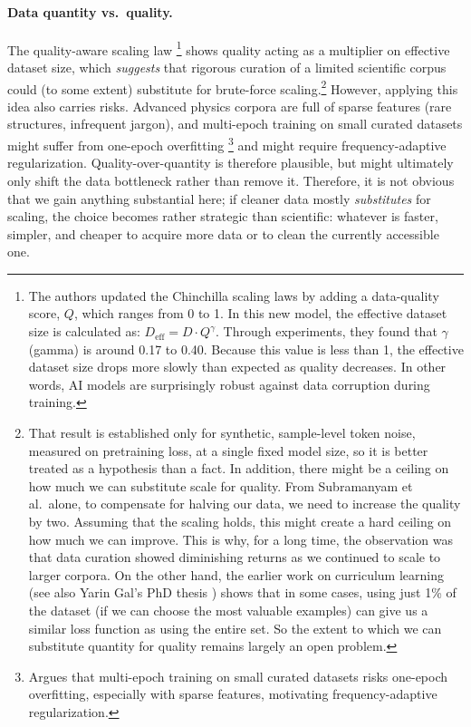 \paragraph{Data quantity vs.\ quality.}
The quality-aware scaling law \cite{2510.03313}\footnote{%
    The authors updated the Chinchilla scaling laws by adding a data-quality score, $Q$, which ranges from 0 to 1. In this new model, the effective dataset size is calculated as: $D_{\mathrm{eff}} = D \cdot Q^\gamma$. Through experiments, they found that $\gamma$ (gamma) is around 0.17 to 0.40. Because this value is less than 1, the effective dataset size drops more slowly than expected as quality decreases. In other words, AI models are surprisingly robust against data corruption during training.
    }
shows quality acting as a multiplier on effective dataset size, which \emph{suggests} that rigorous curation of a limited scientific corpus could (to some extent) substitute for brute-force scaling.\footnote{%
    That result is established only for synthetic, sample-level token noise, measured on pretraining loss, at a single fixed model size, so it is better treated as a hypothesis than a fact. In addition, there might be a ceiling on how much we can substitute scale for quality. From Subramanyam et al.\ alone, to compensate for halving our data, we need to increase the quality by two. Assuming that the scaling holds, this might create a hard ceiling on how much we can improve. This is why, for a long time, the observation was that data curation showed diminishing returns as we continued to scale to larger corpora. On the other hand, the earlier work on curriculum learning (see also Yarin Gal's PhD thesis \cite{gal2016uncertainty}) shows that in some cases, using just 1\% of the dataset (if we can choose the most valuable examples) can give us a similar loss function as using the entire set. So the extent to which we can substitute quantity for quality remains largely an open problem.}
However, applying this idea also carries risks. Advanced physics corpora are full of sparse features (rare structures, infrequent jargon), and multi-epoch training on small curated datasets might suffer from one-epoch overfitting \cite{2511.06374}\footnote{
    Argues that multi-epoch training on small curated datasets risks one-epoch overfitting, especially with sparse features, motivating frequency-adaptive regularization.
    }
and might require frequency-adaptive regularization. Quality-over-quantity is therefore plausible, but might ultimately only shift the data bottleneck rather than remove it. Therefore, it is not obvious that we gain anything substantial here; if cleaner data mostly \emph{substitutes} for scaling, the choice becomes rather strategic than scientific: whatever is faster, simpler, and cheaper to acquire more data or to clean the currently accessible one.

